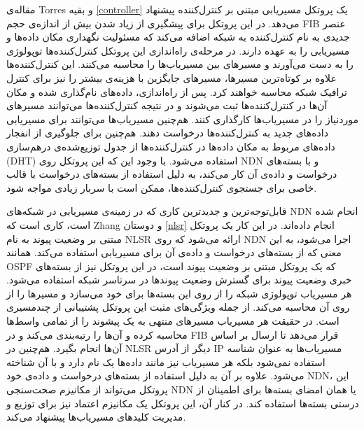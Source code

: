 مقاله‌ی Torres و بقیه \ref{controller} یک پروتکل مسیریابی مبتنی بر کنترل‌کننده پیشنهاد می‌دهد. در این پروتکل برای پیشگیری از زیاد شدن بیش از اندازه‌ی حجم FIB عنصر جدیدی به نام کنترل‌کننده به شبکه اضافه می‌کند که مسئولیت نگهداری مکان داده‌ها و مسیریابی را به عهده دارند. در مرحله‌ی راه‌اندازی این پروتکل کنترل‌کننده‌ها توپولوژی را به دست می‌آورند و مسیرهای بین مسیریاب‌ها را محاسبه می‌کنند. این کنترل‌کننده‌ها علاوه بر کوتاه‌ترین مسیرها، مسیر‌های جایگزین با هزینه‌ی بیشتر را نیز برای کنترل ترافیک شبکه محاسبه خواهند کرد. پس از راه‌اندازی، داده‌های نام‌گذاری شده و مکان آن‌ها در کنترل‌کننده‌ها ثبت می‌شوند و در نتیجه کنترل‌کننده‌ها می‌توانند مسیرهای موردنیاز را در مسیریاب‌ها کارگذاری کنند. هم‌چنین مسیریاب‌ها می‌توانند برای مسیریابی داده‌های جدید به کنترل‌کننده‌ها درخواست دهند. هم‌چنین برای جلوگیری از انفجار داده‌های مربوط به مکان داده‌ها در کنترل‌کننده‌ها از جدول توزیع‌شده‌ی درهم‌سازی  (DHT) استفاده می‌شود. با وجود این که این پروتکل روی NDN و با بسته‌های درخواست و داده‌ی آن کار می‌کند، به دلیل استفاده از بسته‌های درخواست با قالب خاصی برای جستجوی کنترل‌کننده‌ها، ممکن است با سربار زیادی مواجه شود. 

قابل‌توجه‌ترین و جدیدترین کاری که در زمینه‌ی مسیریابی در شبکه‌های NDN انجام شده است، کاری است که Zhang و دوستان \ref{nlsr} انجام داده‌اند. در این کار یک پروتکل مبتنی بر وضعیت پیوند به نام NLSR ارائه می‌شود که روی NDN اجرا می‌شود، به این معنی که از بسته‌های درخواست و داده‌ی آن برای مسیریابی استفاده می‌کند. همانند OSPF که یک پروتکل مبتنی بر وضعیت پیوند است، در این پروتکل نیز از بسته‌های خبری وضعیت پیوند برای گسترش وضعیت پیوندها در سرتاسر شبکه استفاده می‌‌شود. هر مسیریاب توپولوژی شبکه را از روی این بسته‌ها برای خود می‌سازد و مسیرها را از روی آن محاسبه می‌کند. از جمله ویژگی‌های مثبت این پروتکل پشتیبانی از چندمسیری است. در حقیقت هر مسیریاب مسیرهای منتهی به یک پیشوند را از تمامی واسط‌ها محاسبه کرده و آن‌ها را رتبه‌بندی می‌کند و در FIB قرار می‌دهد تا ارسال بر اساس آن‌ها انجام بگیرد. هم‌چنین در NLSR دیگر از آدرس IP مسیریاب‌ها به عنوان شناسه استفاده نمی‌شود بلکه هر مسیریاب نیز مانند داده‌ها یک نام دارد و با آن شناخته می‌شود. علاوه بر آن به دلیل استفاده از بسته‌های درخواست و داده‌ی خود NDN، این پروتکل می‌تواند از مکانیزم صحت‌سنجی NDN یا همان امضای بسته‌ها برای اطمینان از درستی بسته‌ها استفاده کند. در کنار آن، این پروتکل یک مکانیزم اعتماد نیز برای توزیع و مدیریت کلید‌های مسیریاب‌ها پیشنهاد می‌کند.

